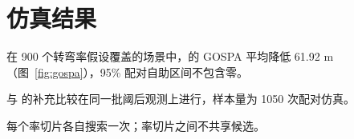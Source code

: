 \section{仿真结果}
在 900 个转弯率假设覆盖的场景中，\method 的 GOSPA 平均降低 61.92 m（图~\ref{fig:gospa}），95\% 配对自助区间不包含零。

与 \gtmethod 的补充比较在同一批阈后观测上进行，样本量为 1050 次配对仿真。

每个率切片各自搜索一次；率切片之间不共享候选。
